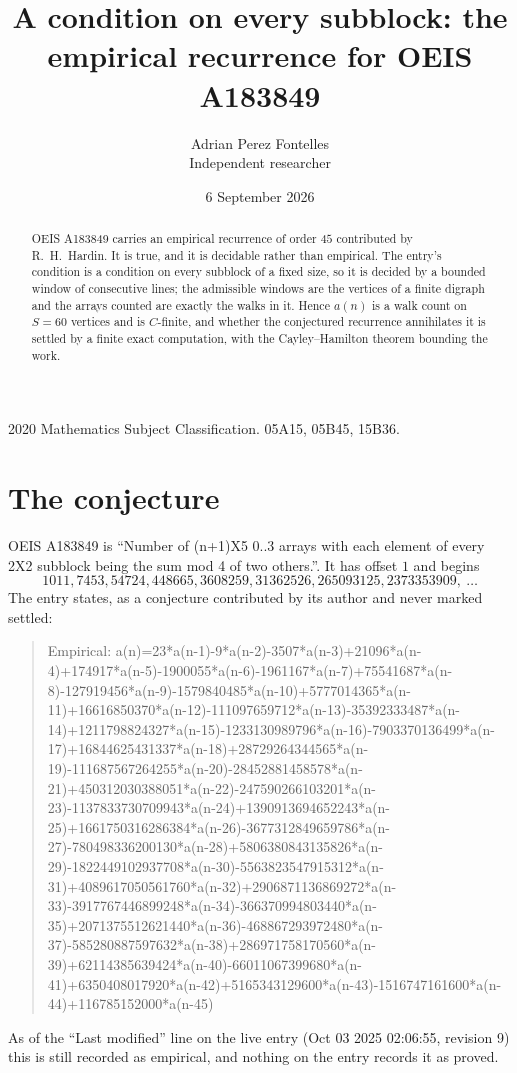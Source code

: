 \documentclass[11pt,a4paper]{article}
\title{A condition on every subblock: the empirical recurrence for OEIS A183849}
\author{Adrian Perez Fontelles\\ \small Independent researcher}
\date{6 September 2026}
\theoremstyle{plain}
\theoremstyle{definition}
\begin{document}
\maketitle

\begin{abstract}
OEIS A183849 carries an empirical recurrence of order $45$ contributed by R.~H.~Hardin. It is
true, and it is decidable rather than empirical. The entry's condition is a condition on every
subblock of a fixed size, so it is decided by a bounded window of consecutive lines; the
admissible windows are the vertices of a finite digraph and the arrays counted are exactly the
walks in it. Hence $a(n)$ is a walk count on $S=60$ vertices and is $C$-finite, and whether the
conjectured recurrence annihilates it is settled by a finite exact computation, with the
Cayley--Hamilton theorem bounding the work.
\end{abstract}

\noindent\small 2020 Mathematics Subject Classification. 05A15, 05B45, 15B36.\normalsize

\section{The conjecture}

OEIS A183849 is ``Number of (n+1)X5 0..3 arrays with each element of every 2X2 subblock being the sum mod 4 of two others.''. It has offset $1$ and begins
\[
1011, 7453, 54724, 448665, 3608259, 31362526, 265093125, 2373353909,\ \dots
\]
The entry states, as a conjecture contributed by its author and never marked settled:
\begin{quote}
Empirical: a(n)=23*a(n-1)-9*a(n-2)-3507*a(n-3)+21096*a(n-4)+174917*a(n-5)-1900055*a(n-6)-1961167*a(n-7)+75541687*a(n-8)-127919456*a(n-9)-1579840485*a(n-10)+5777014365*a(n-11)+16616850370*a(n-12)-111097659712*a(n-13)-35392333487*a(n-14)+1211798824327*a(n-15)-1233130989796*a(n-16)-7903370136499*a(n-17)+16844625431337*a(n-18)+28729264344565*a(n-19)-111687567264255*a(n-20)-28452881458578*a(n-21)+450312030388051*a(n-22)-247590266103201*a(n-23)-1137833730709943*a(n-24)+1390913694652243*a(n-25)+1661750316286384*a(n-26)-3677312849659786*a(n-27)-780498336200130*a(n-28)+5806380843135826*a(n-29)-1822449102937708*a(n-30)-5563823547915312*a(n-31)+4089617050561760*a(n-32)+2906871136869272*a(n-33)-3917767446899248*a(n-34)-366370994803440*a(n-35)+2071375512621440*a(n-36)-468867293972480*a(n-37)-585280887597632*a(n-38)+286971758170560*a(n-39)+62114385639424*a(n-40)-66011067399680*a(n-41)+6350408017920*a(n-42)+5165343129600*a(n-43)-1516747161600*a(n-44)+116785152000*a(n-45)
\end{quote}
As of the ``Last modified'' line on the live entry (Oct 03 2025 02:06:55, revision 9) this is still
recorded as empirical, and nothing on the entry records it as proved.
\end{document}
